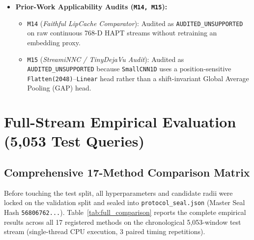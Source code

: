 \documentclass[11pt,a4paper]{article}
\newcommand{\code}[1]{{\small\ttfamily\nolinkurl{#1}}}
\theoremstyle{remark}
\begin{document}
\begin{itemize}
\begin{itemize}
      \item \code{M10} (\textit{CROWN Ambient Box}): Backward linear relaxation (\code{auto\_LiRPA} CROWN) on ambient box.
      \item \code{M11} (\textit{CROWN Wave/Correlated}): Backward linear relaxation on wave/correlated domains.
      \item \code{M12} (\textit{Fixed-Anchor Policy Control}): Enforces immutable anchor lifecycle without re-centering (\code{H16}).
      \item \code{M13} (\textit{Finite-Horizon Control}): Multi-step horizon policy ($H \in \{1, 2\}$) with forced expiration (\code{H17}).
    \end{itemize}
  \item \textbf{Prior-Work Applicability Audits (\code{M14, M15}):}
    \begin{itemize}
      \item \code{M14} (\textit{Faithful LipCache Comparator}): Audited as \code{AUDITED\_UNSUPPORTED} on raw continuous 768-D HAPT streams without retraining an embedding proxy.
      \item \code{M15} (\textit{StreamiNNC / TinyDejaVu Audit}): Audited as \code{AUDITED\_UNSUPPORTED} because \code{SmallCNN1D} uses a position-sensitive \code{Flatten(2048)}--\code{Linear} head rather than a shift-invariant Global Average Pooling (GAP) head.
    \end{itemize}
\end{itemize}

\section{Full-Stream Empirical Evaluation (5,053 Test Queries)}

\subsection{Comprehensive 17-Method Comparison Matrix}
Before touching the test split, all hyperparameters and candidate radii were locked on the validation split and sealed into \code{protocol\_seal.json} (Master Seal Hash \code{56806762...}). Table~\ref{tab:full_comparison} reports the complete empirical results across all 17 registered methods on the chronological 5,053-window test stream (single-thread CPU execution, 3 paired timing repetitions).
\end{document}
